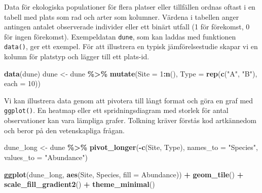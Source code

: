 \documentclass[
]{book}
\newenvironment{Shaded}{\begin{snugshade}}{\end{snugshade}}
\newcommand{\AttributeTok}[1]{\textcolor[rgb]{0.13,0.29,0.53}{#1}}
\newcommand{\DecValTok}[1]{\textcolor[rgb]{0.00,0.00,0.81}{#1}}
\newcommand{\FunctionTok}[1]{\textcolor[rgb]{0.13,0.29,0.53}{\textbf{#1}}}
\newcommand{\NormalTok}[1]{#1}
\newcommand{\OtherTok}[1]{\textcolor[rgb]{0.56,0.35,0.01}{#1}}
\newcommand{\SpecialCharTok}[1]{\textcolor[rgb]{0.81,0.36,0.00}{\textbf{#1}}}
\newcommand{\StringTok}[1]{\textcolor[rgb]{0.31,0.60,0.02}{#1}}
\theoremstyle{definition}
\theoremstyle{definition}
\theoremstyle{definition}
\theoremstyle{definition}
\theoremstyle{remark}
\begin{document}
Data för ekologiska populationer för flera platser eller tillfällen ordnas oftast i en tabell med plats som rad och arter som kolumner. Värdena i tabellen anger antingen antalet observerade individer eller ett binärt utfall (1 för förekomst, 0 för ingen förekomst). Exempeldatan \texttt{dune}, som kan laddas med funktionen \texttt{data()}, ger ett exempel. För att illustrera en typisk jämförelsestudie skapar vi en kolumn för platstyp och lägger till ett plats-id.

\begin{Shaded}
\begin{Highlighting}[]
\FunctionTok{data}\NormalTok{(dune)}
\NormalTok{dune }\OtherTok{\textless{}{-}}\NormalTok{ dune }\SpecialCharTok{\%\textgreater{}\%} 
  \FunctionTok{mutate}\NormalTok{(}\AttributeTok{Site =} \DecValTok{1}\SpecialCharTok{:}\FunctionTok{n}\NormalTok{(), }
         \AttributeTok{Type =} \FunctionTok{rep}\NormalTok{(}\FunctionTok{c}\NormalTok{(}\StringTok{"A"}\NormalTok{, }\StringTok{"B"}\NormalTok{), }\AttributeTok{each =} \DecValTok{10}\NormalTok{))}
\end{Highlighting}
\end{Shaded}

Vi kan illustrera data genom att pivotera till långt format och göra en graf med \texttt{ggplot()}. En heatmap eller ett spridningsdiagram med storlek för antal observationer kan vara lämpliga grafer. Tolkning kräver förstås kod artkännedom och beror på den vetenskapliga frågan.

\begin{Shaded}
\begin{Highlighting}[]
\NormalTok{dune\_long }\OtherTok{\textless{}{-}}\NormalTok{ dune }\SpecialCharTok{\%\textgreater{}\%}
  \FunctionTok{pivot\_longer}\NormalTok{(}\SpecialCharTok{{-}}\FunctionTok{c}\NormalTok{(Site, Type), }\AttributeTok{names\_to =} \StringTok{"Species"}\NormalTok{, }\AttributeTok{values\_to =} \StringTok{"Abundance"}\NormalTok{)}

\FunctionTok{ggplot}\NormalTok{(dune\_long, }\FunctionTok{aes}\NormalTok{(Site, Species, }\AttributeTok{fill =}\NormalTok{ Abundance)) }\SpecialCharTok{+}
  \FunctionTok{geom\_tile}\NormalTok{() }\SpecialCharTok{+}
  \FunctionTok{scale\_fill\_gradient2}\NormalTok{() }\SpecialCharTok{+}
  \FunctionTok{theme\_minimal}\NormalTok{()}
\end{Highlighting}
\end{Shaded}
\end{document}

